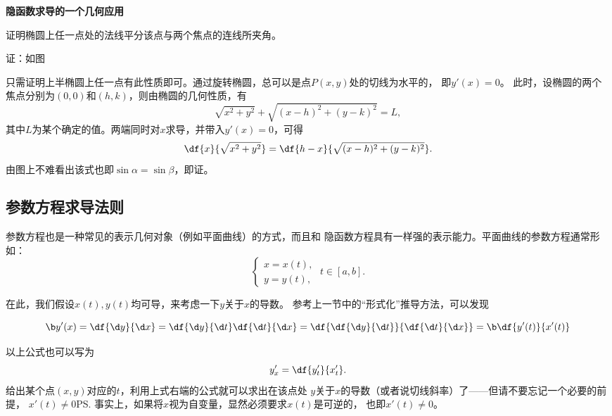 \begin{shaded}
	{\bf 隐函数求导的一个几何应用}
	
	\egz 证明椭圆上任一点处的法线平分该点与两个焦点的连线所夹角。

	证：如图
	\begin{center}
	\end{center}
	只需证明上半椭圆上任一点有此性质即可。通过旋转椭圆，总可以是点$P(x,y)$处的切线为水平的，
	即$y'(x)=0$。
	此时，设椭圆的两个焦点分别为$(0,0)$和$(h,k)$，则由椭圆的几何性质，有
	$$\sqrt{x^2+y^2}+\sqrt{(x-h)^2+(y-k)^2}=L,$$
	其中$L$为某个确定的值。两端同时对$x$求导，并带入$y'(x)=0$，可得
	$$\df{x}{\sqrt{x^2+y^2}}=\df{h-x}{\sqrt{(x-h)^2+(y-k)^2}}.$$
	由图上不难看出该式也即$\sin\alpha=\sin\beta$，即证。
	\fin
\end{shaded}

\subsection{参数方程求导法则}

参数方程也是一种常见的表示几何对象（例如平面曲线）的方式，而且和
隐函数方程具有一样强的表示能力。平面曲线的参数方程通常形如：
$$
	\left\{\begin{array}{l}
		x=x(t),\\
		y=y(t),
	\end{array}\right.\;t\in [a,b].
$$

在此，我们假设$x(t),y(t)$均可导，来考虑一下$y$关于$x$的导数。
参考上一节中的“形式化”推导方法，可以发现
\begin{thx}
	$${\b y'(x)}=\df{\d y}{\d x}=\df{\d y}{\d t}\df{\d t}{\d x}
	=\df{\df{\d y}{\d t}}{\df{\d t}{\d x}}={\b \df{y'(t)}{x'(t)}}$$
\end{thx}
以上公式也可以写为
$$y'_x=\df{y'_t}{x'_t}.$$
给出某个点$(x,y)$对应的$t$，利用上式右端的公式就可以求出在该点处
$y$关于$x$的导数（或者说切线斜率）了——但请不要忘记一个必要的前提，
$x'(t)\ne 0$\ps{事实上，如果将$x$视为自变量，显然必须要求$x(t)$是可逆的，
也即$x'(t)\ne 0$}。

